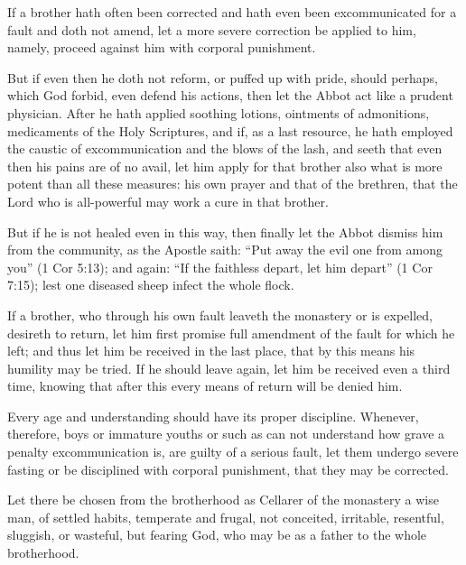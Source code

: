 
If a brother hath often been corrected and hath even been excommunicated for a fault and doth not amend, let a more severe correction be applied to him, namely, proceed against him with corporal punishment.

But if even then he doth not reform, or puffed up with pride, should perhaps, which God forbid, even defend his actions, then let the Abbot act like a prudent physician. After he hath applied soothing lotions, ointments of admonitions, medicaments of the Holy Scriptures, and if, as a last resource, he hath employed the caustic of excommunication and the blows of the lash, and seeth that even then his pains are of no avail, let him apply for that brother also what is more potent than all these measures: his own prayer and that of the brethren, that the Lord who is all-powerful may work a cure in that brother.

But if he is not healed even in this way, then finally let the Abbot dismiss him from the community, as the Apostle saith: ``Put away the evil one from among you'' (1 Cor 5:13); and again: ``If the faithless depart, let him depart'' (1 Cor 7:15); lest one diseased sheep infect the whole flock.


If a brother, who through his own fault leaveth the monastery or is expelled, desireth to return, let him first promise full amendment of the fault for which he left; and thus let him be received in the last place, that by this means his humility may be tried. If he should leave again, let him be received even a third time, knowing that after this every means of return will be denied him.


Every age and understanding should have its proper discipline. Whenever, therefore, boys or immature youths or such as can not understand how grave a penalty excommunication is, are guilty of a serious fault, let them undergo severe fasting or be disciplined with corporal punishment, that they may be corrected.


Let there be chosen from the brotherhood as Cellarer of the monastery a wise man, of settled habits, temperate and frugal, not conceited, irritable, resentful, sluggish, or wasteful, but fearing God, who may be as a father to the whole brotherhood.

